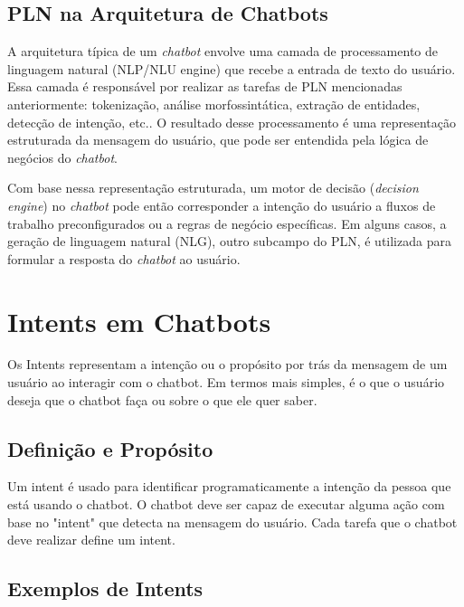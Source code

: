 \documentclass[14pt,a4paper,oneside]{book}
\begin{document}
\section{PLN na Arquitetura de Chatbots}

A arquitetura típica de um \textit{chatbot} envolve uma camada de processamento de linguagem natural (NLP/NLU engine) que recebe a entrada de texto do usuário. Essa camada é responsável por realizar as tarefas de PLN mencionadas anteriormente: tokenização, análise morfossintática, extração de entidades, detecção de intenção, etc.. O resultado desse processamento é uma representação estruturada da mensagem do usuário, que pode ser entendida pela lógica de negócios do \textit{chatbot}.

Com base nessa representação estruturada, um motor de decisão (\textit{decision engine}) no \textit{chatbot} pode então corresponder a intenção do usuário a fluxos de trabalho preconfigurados ou a regras de negócio específicas. Em alguns casos, a geração de linguagem natural (NLG), outro subcampo do PLN, é utilizada para formular a resposta do \textit{chatbot} ao usuário.


\chapter{Intents em Chatbots}
\label{chap:intents}

Os Intents representam a intenção ou o propósito por trás da mensagem de um usuário ao interagir com o chatbot. Em termos mais simples, é o que o usuário deseja que o chatbot faça ou sobre o que ele quer saber.

\section{Definição e Propósito}
\label{sec:intents_definicao}

Um intent é usado para identificar programaticamente a intenção da pessoa que está usando o chatbot. O chatbot deve ser capaz de executar alguma ação com base no "intent" que detecta na mensagem do usuário. Cada tarefa que o chatbot deve realizar define um intent.

\section{Exemplos de Intents}
\label{sec:intents_exemplos}
\end{document}
